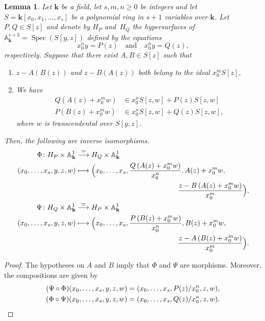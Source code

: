 \documentclass[JEP,XML,SOM,Unicode,NoFloatCountersInSection,published]{cedram}
\newcommand\mto{\mathchoice{\longmapsto}{\mapsto}{\mapsto}{\mapsto}}
\newtheorem{lemma}{Lemma}[section]
\theoremstyle{definition}
\newcommand\iso{\stackrel{\simeq}{\longrightarrow}}
\newcommand\A{{\mathbb A}}\let\AA\A
\renewcommand\k{{\mathbf k}}
\newcommand{\kk}{\mathbf{k}}
\DeclareMathOperator{\Spec}{Spec}
\begin{document}
\begin{lemma}\label{Lemma-Iso}
Let $\kk$ be a field, let $s,m,n\geq0$ be integers and let $S=\k[x_0,x_1,\ldots,x_s]$ be a polynomial ring in $s+1$ variables over $\kk$.
Let $P,Q\in S[z]$ and denote by $H_P$ and~$H_Q$ the hypersurfaces of $\A^{s+3}_{\k}=\Spec(S[y,z])$ defined by the equations
\[
x_0^ny=P(z) \quad \text{and}
\quad x_0^ny=Q(z),
\]
respectively. Suppose that there exist $A,B\in S[z]$ such that
\begin{enumerate}
\item $z-A(B(z))$ and $z-B(A(z))$ both belong to the ideal $x_0^{m}S[z]$,
\item We have
\begin{align*}
Q\left(A(z)+x_0^{m}w\right)&\in x_0^nS[z,w]+P(z)S[z,w]\\
\tag*{and}
P\left(B(z)+x_0^{m}w\right)&\in x_0^nS[z,w]+Q(z)S[z,w],
\end{align*}
where $w$ is transcendental over $S[y,z]$.
\end{enumerate}
Then, the following are inverse isomorphisms.
\begin{align*}
\Phi\colon H_P\times\A^1_{\k} &\iso H_Q\times\A^1_{\k}\\
(x_0,\ldots,x_s,y,z,w) &\mto \Bigl(x_0,\ldots,x_s,\frac{Q\left(A(z)+x_0^{m}w\right)}{x_0^n},  A(z)+x_0^{m}w,\\
&\hspace*{5cm}\frac{z-B\left(A(z)+x_0^{m}w\right)}{x_0^{m}}\Bigr),\\
\Psi\colon H_Q \times\A^1_{\k} &\iso H_P\times\A^1_{\k}\\
(x_0,\ldots,x_s,y,z,w) &\mto \Bigl(x_0,\ldots,x_s,\frac{P\left(B(z)+x_0^{m}w\right)}{x_0^n}, B(z)+x_0^{m}w,\\
&\hspace*{5cm}\frac{z-A\left(B(z)+x_0^{m}w\right)}{x_0^{m}}\Bigr).
\end{align*}
\end{lemma}

\begin{proof}
The hypotheses on $A$ and $B$ imply that $\Phi$ and $\Psi$ are morphisms. Moreover, the compositions are given by
\begin{align*}
(\Psi\circ\Phi)(x_0,\ldots,x_s,y,z,w)&=(x_0,\ldots,x_s,P(z)/x_0^n,z,w),\\
(\Phi\circ\Psi)(x_0,\ldots,x_s,y,z,w)&=(x_0,\ldots,x_s,Q(z)/x_0^n,z,w).\qedhere
\end{align*}
\end{proof}
\end{document}
